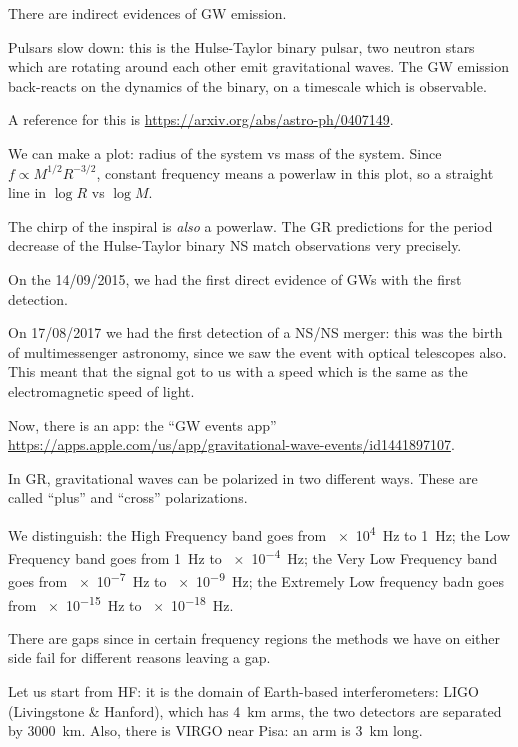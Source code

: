 \documentclass[main.tex]{subfiles}
\begin{document}
There are indirect evidences of GW emission.

Pulsars slow down: this is the Hulse-Taylor binary pulsar, two neutron stars which are rotating around each other emit gravitational waves. The GW emission back-reacts on the dynamics of the binary, on a timescale which is observable.  

A reference for this is \url{https://arxiv.org/abs/astro-ph/0407149}. 

We can make a plot: radius of the system vs mass of the system. Since  \(f \propto M^{1/2} R^{-3/2}\), constant frequency means a powerlaw in this plot, so a straight line in \(\log R \) vs \( \log M\). 

The chirp of the inspiral is \emph{also} a powerlaw. 
The GR predictions for the period decrease of the Hulse-Taylor binary NS match observations very precisely.

On the 14/09/2015, we had the first direct evidence of GWs with the first detection. 

On 17/08/2017 we had the first detection of a NS/NS merger: this was the birth of multimessenger astronomy, since we saw the event with optical telescopes also. This meant that the signal got to us with a speed which is the same as the electromagnetic speed of light. 

Now, there is an app: the ``GW events app'' \url{https://apps.apple.com/us/app/gravitational-wave-events/id1441897107}. 

In GR, gravitational waves can be polarized in two different ways. These are called ``plus'' and ``cross'' polarizations. 


We distinguish: the High Frequency band goes from \SI{e4}{Hz} to \SI{1}{Hz}; the Low Frequency band goes from \SI{1}{Hz} to \SI{e-4}{Hz}; the Very Low Frequency band goes from \SI{e-7}{Hz} to \SI{e-9}{Hz}; the Extremely Low frequency badn goes from \SI{e-15}{Hz} to \SI{e-18}{Hz}. 

There are gaps since in certain frequency regions the methods we have on either side fail for different reasons leaving a gap.

Let us start from HF: it is the domain of Earth-based interferometers: LIGO (Livingstone \& Hanford), which has \SI{4}{km} arms, the two detectors are separated by \SI{3000}{km}. Also, there is VIRGO near Pisa: an arm is \SI{3}{km} long. 
\end{document}
